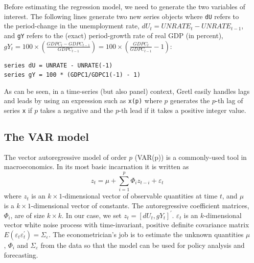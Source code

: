 \documentclass[11pt]{article}
\begin{document}
Before estimating the regression model, we need to generate the two variables of interest. The following lines generate two new series objects where \texttt{dU} refers to the period-change in the unemployment rate, $ dU_t = UNRATE_t - UNRATE_{t-1} $, and \texttt{gY} refers to the (exact) period-growth rate of real GDP (in percent), $ gY_t =  100 \times \left( \frac{GDPC_t - GDPC_{t-1}}{GDPC_{t-1}}\right) = 100 \times \left( \frac{GDPC_t}{GDPC_{t-1}}-1 \right)$:
\begin{Verbatim}[baselinestretch=0.75, fontsize=\small]
series dU = UNRATE - UNRATE(-1)
series gY = 100 * (GDPC1/GDPC1(-1) - 1)
\end{Verbatim}
As can be seen, in a time-series (but also panel) context, Gretl easily handles lags and leads by using an expression such as \texttt{x(p)} where $ p $ generates the $ p $-th lag of series \texttt{x} if $p$  takes a negative and the $ p $-th lead if it takes a positive integer value.

\subsection{The VAR model}
The vector autoregressive model of order $ p $ (VAR(p)) is a commonly-used tool in macroeconomics. In its most basic incarnation it is written as
\begin{equation}
\label{eq:VAR}
	z_t = \mu + \sum_{i=1}^p \Phi_i z_{t-i} + \varepsilon_t
\end{equation}
where $z_t$ is an $k \times 1$-dimensional vector of observable quantities at time $t$, and $ \mu $ is a $k \times 1$-dimensional vector of constants. The autoregressive coefficient matrices, $\Phi_i$, are of size $ k\times k $. In our case, we set $z_t=\left[dU_t, gY_t\right]^\prime$. %
$\varepsilon_t$ is an $k$-dimensional vector white noise process with time-invariant, positive definite covariance matrix $ E(\varepsilon_t \varepsilon^\prime_t)=\Sigma_\varepsilon $. The econometrician's job is to estimate the unknown quantities $\mu$, $\Phi_i$ and $ \Sigma_\varepsilon $ from the data so that the model can be used for policy analysis and forecasting.
\end{document}
